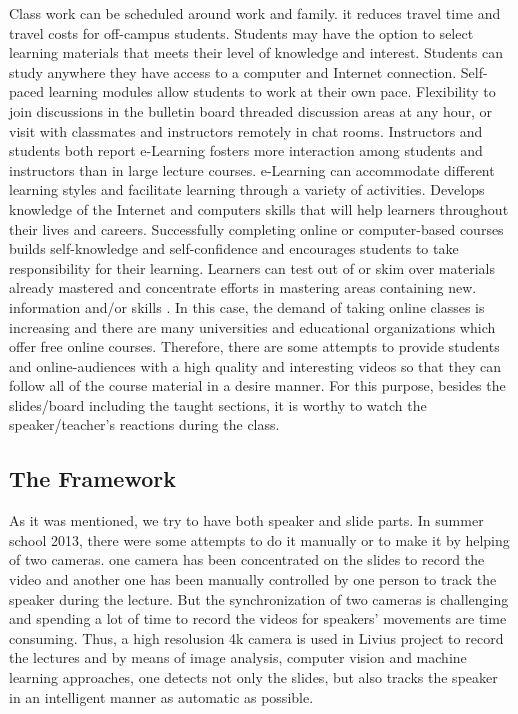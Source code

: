 \documentclass[[12pt,DIV14,BCOR12mm,a4paper,footexclude,headinclude,halfparskip-,twoside,openright,cleardoubleempty,idxtotoc,bibtotoc]{article}
\begin{document}
Class work can be scheduled around work and family.
it reduces travel time and travel costs for off-campus students.
Students may have the option to select learning materials that meets their level of knowledge and interest.
Students can study anywhere they have access to a computer and Internet connection.
Self-paced learning modules allow students to work at their own pace.
Flexibility to join discussions in the bulletin board threaded discussion areas at any hour, or visit with classmates and instructors remotely in chat rooms.
Instructors and students both report e-Learning fosters more interaction among students and instructors than in large lecture courses.
e-Learning can accommodate different learning styles and facilitate learning through a variety of activities. Develops knowledge of the Internet and computers skills that will help learners throughout their lives and careers.
Successfully completing online or computer-based courses builds self-knowledge and self-confidence and encourages students to take responsibility for their learning.
Learners can test out of or skim over materials already mastered and concentrate efforts in mastering areas containing new. information and/or skills \cite{IOWA:Online}.
In this case, the demand of taking online classes is increasing and there are many universities and educational organizations which offer free online courses. Therefore, there are some attempts to provide students and online-audiences with a high quality and interesting videos so that they can follow all of the course material in a desire manner. For this purpose, besides the slides/board including the taught sections, it is worthy to watch the speaker/teacher's reactions during the class.



\subsection{The Framework }

As it was mentioned, we try to have both speaker and slide parts. In summer school 2013, there were some attempts to do it manually or to make it by helping of two cameras. one camera has been concentrated on the slides to record the video and another one has been manually controlled by one person to track the speaker during the lecture. But the synchronization of two cameras is challenging and spending a lot of time to record the videos for speakers' movements are time consuming. Thus, a high resolusion 4k camera is used in Livius project to record the lectures and by means of image analysis, computer vision and machine learning approaches, one detects not only the slides, but also tracks the speaker in an intelligent manner as automatic as possible.
\end{document}
